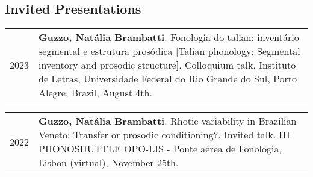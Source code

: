 \documentclass[letterpaper,10pt]{article}
\begin{document}
 

 
 
\vspace{-0.2cm} 
 
 \subsection*{Invited Presentations}
 
 
 


 \begin{tabular}{p{1cm}p{16cm}}	
 2023 & \textbf{Guzzo, Nat\'alia Brambatti}. Fonologia do talian: invent\'ario segmental e estrutura pros\'odica [Talian phonology: Segmental inventory and prosodic structure]. Colloquium talk. Instituto de Letras, Universidade Federal do Rio Grande do Sul, Porto Alegre, Brazil, August 4th.
 \end{tabular}


\begin{tabular}{p{1cm}p{16cm}}	
 2022 & \textbf{Guzzo, Nat\'alia Brambatti}. Rhotic variability in Brazilian Veneto: Transfer or prosodic conditioning?. Invited talk. III PHONOSHUTTLE OPO-LIS - Ponte a\'erea de Fonologia, Lisbon (virtual), November 25th.
 \end{tabular}
\end{document}
